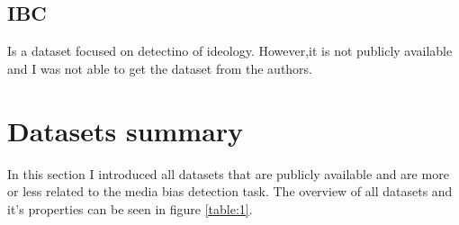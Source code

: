 \subsection{IBC}
Is a dataset focused on detectino of ideology. However,it is not publicly available and I was not able to get the dataset from the authors.


\section{Datasets summary}
In this section I introduced all datasets that are publicly available and are more or less related to the media bias detection task. The overview of all datasets and it's properties can be seen in figure \ref{table:1}.
